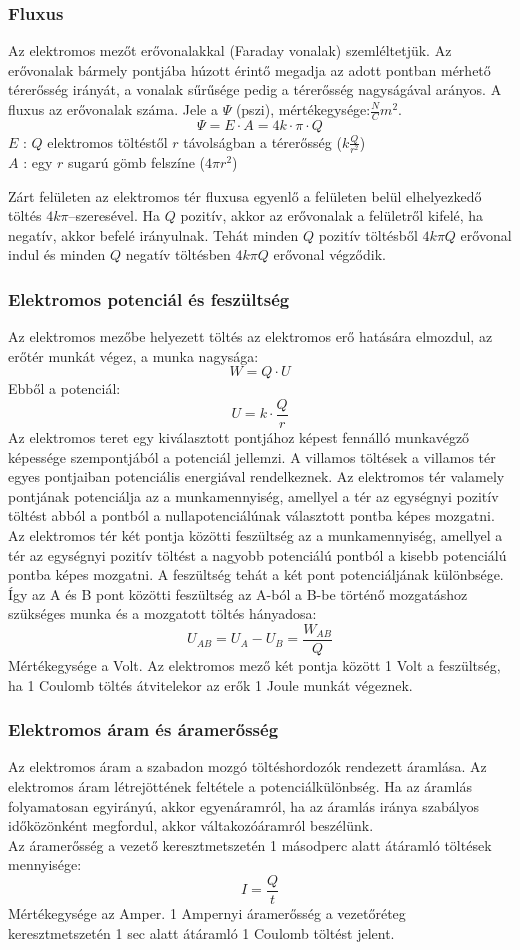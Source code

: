 \subsubsection{Fluxus}
Az elektromos mezőt erővonalakkal (Faraday vonalak) szemléltetjük. Az erővonalak bármely pontjába húzott érintő megadja az adott pontban mérhető térerősség irányát, a vonalak sűrűsége pedig a térerősség nagyságával arányos. A fluxus az erővonalak száma. Jele a $\Psi$ (pszi), mértékegysége:$\frac{N}{C}m^2$.
$$ \varPsi = E \cdot A = 4k \cdot \pi \cdot Q $$
$E$ : $Q$ elektromos töltéstől $r$ távolságban a térerősség ($k\frac{Q}{r^2}$)\\
$A$ : egy $r$ sugarú gömb felszíne ($4\pi r^2$)
\begin{theorem}
	Zárt felületen az elektromos tér fluxusa egyenlő a felületen belül elhelyezkedő töltés $4k\pi$–szeresével. Ha $Q$ pozitív, akkor az erővonalak a felületről kifelé, ha negatív, akkor befelé irányulnak. Tehát minden $Q$ pozitív töltésből $4k\pi Q$ erővonal indul és minden $Q$ negatív töltésben $4k\pi Q$ erővonal végződik.
\end{theorem}

\subsubsection{Elektromos potenciál és feszültség}
Az elektromos mezőbe helyezett töltés az elektromos erő hatására elmozdul, az erőtér munkát végez, a munka nagysága:
$$W = Q \cdot U$$
Ebből a potenciál:
$$U = k\cdot \frac{Q}{r}$$
Az elektromos teret egy kiválasztott pontjához képest fennálló munkavégző képessége szempontjából a potenciál jellemzi. A villamos töltések a villamos tér egyes pontjaiban potenciális energiával rendelkeznek.
Az elektromos tér valamely pontjának potenciálja az a munkamennyiség, amellyel a tér az egységnyi pozitív töltést abból a pontból a nullapotenciálúnak választott pontba képes mozgatni.
Az elektromos tér két pontja közötti feszültség az a munkamennyiség, amellyel a tér az egységnyi pozitív töltést a nagyobb potenciálú pontból a kisebb potenciálú pontba képes mozgatni. A feszültség tehát a két
pont potenciáljának különbsége. 
Így az A és B pont közötti feszültség az A-ból a B-be történő mozgatáshoz szükséges munka és a mozgatott töltés hányadosa:
$$U_{AB} = U_A - U_B = \frac{W_{AB}}{Q}$$
Mértékegysége a Volt. Az elektromos mező két pontja között 1 Volt a feszültség, ha 1 Coulomb töltés átvitelekor az erők 1 Joule munkát végeznek.

\subsubsection{Elektromos áram és áramerősség}
Az elektromos áram a szabadon mozgó töltéshordozók rendezett áramlása. Az elektromos áram létrejöttének feltétele a potenciálkülönbség. Ha az áramlás folyamatosan egyirányú, akkor egyenáramról, ha az áramlás iránya szabályos időközönként megfordul, akkor váltakozóáramról beszélünk.\\
Az áramerősség a vezető keresztmetszetén 1 másodperc alatt átáramló töltések mennyisége:
$$ I = \frac{Q}{t}$$
Mértékegysége az Amper.
1 Ampernyi áramerősség a vezetőréteg keresztmetszetén 1 sec alatt átáramló 1 Coulomb töltést jelent.

